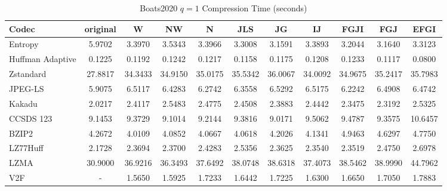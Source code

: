 \documentclass{article}
\begin{document}
\begin{table}[h!]
    \centering
    \caption{Boats2020 $q=1$ Compression Time (seconds)}
    \begin{tabular}{|l|cccccccccc|}
        \hline
        Codec &  original &      W &     NW &      N &    JLS &     JG &     IJ &   FGJI &    FGJ &   EFGI \\ \hline
        Entropy & 5.9702 & 3.3970 & 3.5343 & 3.3966 & 3.3008 & 3.1591 & 3.3893 & 3.2044 & 3.1640 & 3.3123 \\ \hline
Huffman Adaptive                                &    0.1225 &  0.1192 &  0.1242 &  0.1217 &  0.1158 &  0.1175 &  0.1208 &  0.1233 &  0.1117 &  0.0800 \\
Zstandard                              &   27.8817 & 34.3433 & 34.9150 & 35.0175 & 35.5342 & 36.0067 & 34.0092 & 34.9675 & 35.2417 & 35.7983 \\
JPEG-LS                                &    5.9075 &  6.5117 &  6.4283 &  6.2742 &  6.3558 &  6.5292 &  6.5175 &  6.2242 &  6.4908 &  6.4742 \\
Kakadu                        &    2.0217 &  2.4117 &  2.5483 &  2.4775 &  2.4508 &  2.3883 &  2.4442 &  2.3475 &  2.3192 &  2.5325 \\
CCSDS 123 &    9.1453 &  9.3729 &  9.1014 &  9.2144 &  9.3816 &  9.0171 &  9.5062 &  9.4787 &  9.3575 & 10.6457 \\
BZIP2                                 &    4.2672 &  4.0109 &  4.0852 &  4.0667 &  4.0618 &  4.2026 &  4.1341 &  4.9463 &  4.6297 &  4.7750 \\
LZ77Huff                     &    2.1728 &  2.3694 &  2.3700 &  2.4283 &  2.5356 &  2.3625 &  2.3540 &  2.3519 &  2.4750 &  2.6978 \\
LZMA &   30.9000 & 36.9216 & 36.3493 & 37.6492 & 38.0748 & 38.6318 & 37.4073 & 38.5462 & 38.9990 & 44.7962 \\
V2F                      &    - &  1.5650 &  1.5925 &  1.7233 &  1.6442 &   1.7225 &   1.6300 &   1.6650 &   1.7050 &  1.7883 \\
        \hline
    \end{tabular}
\end{table}
\newpage
\end{document}
